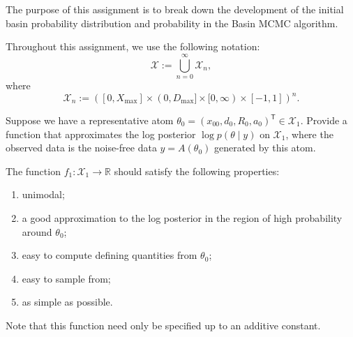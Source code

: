 \documentclass{homework}
\newcommand*{\R}{\mathbb R}
\begin{document}
\maketitle

The purpose of this assignment is to break down the 
development of the initial basin probability distribution and probability 
in the Basin MCMC algorithm.

Throughout this assignment, we use the following notation:
\[
\mathcal{X} := \bigcup_{n=0}^\infty \mathcal{X}_n,
\]
where
\[
    \mathcal{X}_n := \left( [0, X_{\text{max}} ] \times (0, D_{\text{max}} ] \times [0, \infty) \times [-1, 1] \right)^n.
\]


\question*{}  
Suppose we have a representative atom $\theta_0=(x_{00},d_0,R_0,a_0)^{\mathsf T}\in\mathcal{X}_1$.
Provide a function that approximates the log posterior $\log p(\theta\mid y)$ on $\mathcal{X}_1$, 
where the observed data is the noise-free data $y=A(\theta_0)$ generated by this atom.

The function $f_1: \mathcal{X}_1 \to \R$ should satisfy the following properties:
\begin{enumerate}
    \item unimodal;
    \item a good approximation to the log posterior in the region of high probability around $\theta_0$;
    \item easy to compute defining quantities from $\theta_0$;
    \item easy to sample from;
    \item as simple as possible.
\end{enumerate}

Note that this function need only be specified up to an additive constant.
\end{document}
